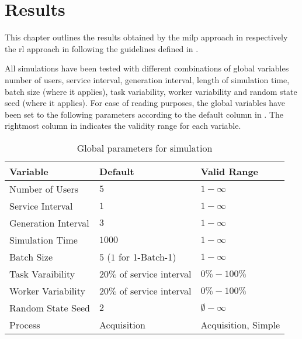 \chapter{Results}
\label{ch:results}

This chapter outlines the results obtained by the \gls{milp} approach in  respectively the \gls{rl} approach in  following the guidelines defined in .

All simulations have been tested with different combinations of global variables \ie number of users, service interval, generation interval, length of simulation time, batch size (where it applies), task variability, worker variability and random state seed (where it applies). For ease of reading purposes, the global variables have been set to the following parameters according to the default column in . The rightmost column in  indicates the validity range for each variable.

\begin{table}[!ht]
	\centering
		\begin{tabular}{@{}lll@{}}
		\toprule
		Variable            & Default     & Valid Range \\ \midrule
		Number of Users     & $5$           & $1-\infty$      \\
		Service Interval    & $1$           & $1-\infty$      \\
		Generation Interval & $3$           & $1-\infty$      \\
		Simulation Time     & $1000$          & $1-\infty$      \\
		Batch Size          & $5$ ($1$ for 1-Batch-1)           & $1-\infty$      \\
		Task Varaibility    & $20\%$ of service interval       & $0\%-100\%$      \\
		Worker Variability  & $20\%$ of service interval       & $0\%-100\%$      \\
		Random State Seed   & $2$           & $\emptyset-\infty$      \\
		Process    & Acquisition & Acquisition, Simple      \\ \bottomrule
		\end{tabular}
	\caption{Global parameters for simulation}
	\label{tab:global_parameters_sim}
\end{table}

